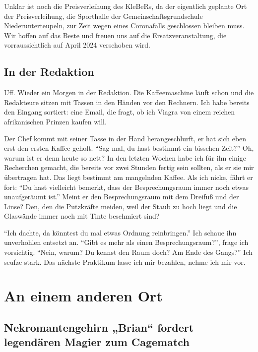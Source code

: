 \documentclass[final]{multiversum}
\begin{document}
Unklar ist noch die Preisverleihung des KleBeRs, da der eigentlich geplante Ort der Preisverleihung, die Sporthalle der Gemeinschaftsgrundschule Niederunterteupeln, zur Zeit wegen eines Coronafalls geschlossen bleiben muss.
Wir hoffen auf das Beste und freuen uns auf die Ersatzveranstaltung, die vorraussichtlich auf April 2024 verschoben wird.

\subsection{In der Redaktion}
Uff. Wieder ein Morgen in der Redaktion.
Die Kaffeemaschine läuft schon und die Redakteure sitzen mit Tassen in den Händen vor den Rechnern.
Ich habe bereits den Eingang sortiert: eine Email, die fragt, ob ich Viagra von einem reichen afrikanischen Prinzen kaufen will.

Der Chef kommt mit seiner Tasse in der Hand herangeschlurft, er hat sich eben erst den ersten Kaffee geholt.
\enquote{Sag mal, du hast bestimmt ein bisschen Zeit?}
Oh, warum ist er denn heute so nett?
In den letzten Wochen habe ich für ihn einige Recherchen gemacht, die bereits vor zwei Stunden fertig sein sollten, als er sie mir übertragen hat.
Das liegt bestimmt am mangelnden Kaffee.
Als ich nicke, fährt er fort:
\enquote{Du hast vielleicht bemerkt, dass der Besprechungsraum immer noch etwas unaufgeräumt ist.}
Meint er den Besprechungsraum mit dem Dreifuß und der Linse?
Den, den die Putzkräfte meiden, weil der Staub zu hoch liegt und die Glaswände immer noch mit Tinte beschmiert sind?

 \enquote{Ich dachte, da könntest du mal etwas Ordnung reinbringen.}
 Ich schaue ihn unverhohlen entsetzt an.
 \enquote{Gibt es mehr als einen Besprechungsraum?}, frage ich vorsichtig.
 \enquote{Nein, warum? Du kennst den Raum doch? Am Ende des Gangs?}
 Ich seufze stark.
 Das nächste Praktikum lasse ich mir bezahlen, nehme ich mir vor.

\section{An einem anderen Ort}

\subsection{Nekromantengehirn „Brian“ fordert legendären Magier zum Cagematch}
\end{document}
